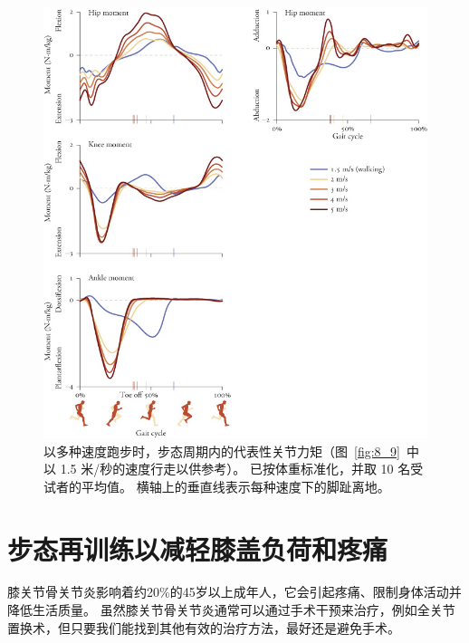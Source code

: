 \begin{figure}[!htb]
	\centering
	\includegraphics[width=1.0\linewidth]{chap8/8_10}
	\caption{以多种速度跑步时，步态周期内的代表性关节力矩（图~\ref{fig:8_9}~中以 1.5 米/秒的速度行走以供参考）。
		已按体重标准化，并取 10 名受试者的平均值。
		横轴上的垂直线表示每种速度下的脚趾离地\cite{hamner2013muscle}。 \label{fig:8_10}}
\end{figure}


\section{步态再训练以减轻膝盖负荷和疼痛}

膝关节骨关节炎影响着约20\%的45岁以上成年人，它会引起疼痛、限制身体活动并降低生活质量。
虽然膝关节骨关节炎通常可以通过手术干预来治疗，例如全关节置换术，但只要我们能找到其他有效的治疗方法，最好还是避免手术。









